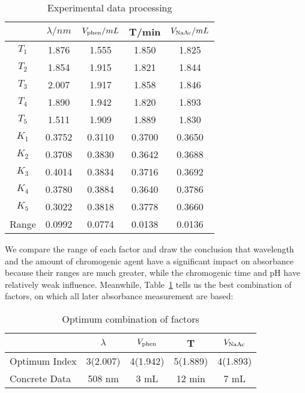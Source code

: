 \begin{table}[H]
    \caption{Experimental data processing}
    \label{Tab.OrtPro}
    \begin{tabular}{ccccc}
    \toprule
    & $\lambda /nm$ & $V_{\ce{phen}}/mL$ & T/min & $V_{\ce{NaAc}}/mL$\\
    \midrule
    $T_1$ & 1.876 & 1.555 & 1.850 & 1.825 \\
    $T_2$ & 1.854 & 1.915 & 1.821 & 1.844 \\
    $T_3$ & 2.007 & 1.917 & 1.858 & 1.846 \\
    $T_4$ & 1.890 & 1.942 & 1.820 & 1.893 \\
    $T_5$ & 1.511 & 1.909 & 1.889 & 1.830 \\
    $K_1$ & 0.3752 & 0.3110 & 0.3700 & 0.3650 \\
    $K_2$ & 0.3708 & 0.3830 & 0.3642 & 0.3688 \\
    $K_3$ & 0.4014 & 0.3834 & 0.3716 & 0.3692 \\
    $K_4$ & 0.3780 & 0.3884 & 0.3640 & 0.3786 \\
    $K_5$ & 0.3022 & 0.3818 & 0.3778 & 0.3660 \\
    Range & 0.0992 & 0.0774 & 0.0138 & 0.0136 \\
    \bottomrule
    \end{tabular}
\end{table}
We compare the range of each factor and draw the conclusion that wavelength and the amount of chromogenic agent have a significant impact on absorbance because their ranges are much greater, while the chromogenic time and pH have relatively weak influence. Meanwhile, Table~\ref{Tab.OrtPro} tells us the best combination of factors, on which all later absorbance measurement are based:

\begin{table}[H]
    \caption{Optimum combination of factors}
    \label{tab.Opt}
    \begin{tabular}{lcccc}
    \toprule
    & $\lambda$ & $V_{\ce{phen}}$ & T & $V_{\ce{NaAc}}$\\
    \midrule
    Optimum Index & 3(2.007) & 4(1.942) & 5(1.889) & 4(1.893)\\
    Concrete Data & 508 nm   & 3 mL     & 12 min   & 7 mL    \\
    \bottomrule
    \end{tabular}
\end{table}

